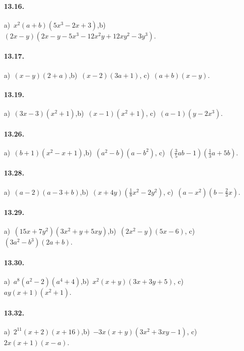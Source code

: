 \paragraph{13.16.}
a)~$x^{2}(a+b)(5x^{3}-2x+3)$,\quad b)~$(2x-y)\left(2x-y-5x^3-12x^2y+12xy^2-3y^3\right)$.

\paragraph{13.17.}
a)~$(x-y)(2+a)$,\quad b)~$(x-2)(3a+1)$, \quad c)~$(a+b)(x-y)$.

\paragraph{13.19.}
a)~$(3x-3)\left(x^2+1\right)$,\quad b)~$(x-1)\left(x^{2}+1\right)$, \quad c)~$(a-1)\left(y-2x^{3}\right)$.

\paragraph{13.26.}
a)~$(b+1)(x^{2}-x+1)$,\quad b)~$\left(a^{2}-b\right)\left(a-b^{2}\right)$, \quad c)~$\left(\frac{3}{5}ab-1\right)\left(\frac{1}{3}a+5b\right)$.

\paragraph{13.28.}
a)~$(a-2)(a-3+b)$,\quad b)~$(x+4y)\left(\frac{1}{8}x^2-2y^2\right)$, \quad c)~$\left(a-x^2\right)\left(b-\frac{2}{3}x\right)$.

\paragraph{13.29.}
a)~$\left(15x+7y^{2}\right)\left(3x^{2}+y+5xy\right)$,\quad b)~$\left(2x^2-y\right)(5x-6)$, \quad c)~$(3a^2-b^3)(2a+b)$.

\paragraph{13.30.}
a)~$a^{8}\left(a^{2}-2\right)\left(a^{4}+4\right)$,\quad b)~$x^{2}(x+y)(3x+3y+5)$, \quad c)~$ay(x+1)(x^{2}+1)$.

\paragraph{13.32.}
a)~$2^{11}(x+2)(x+16)$,\quad b)~$-3x(x+y)\left(3x^2+3xy-1\right)$, \quad c)~$2x(x+1)(x-a)$.

